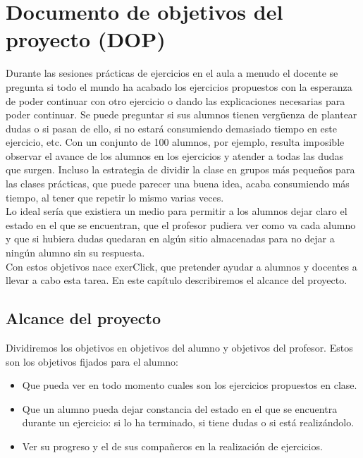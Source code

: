 
\pagestyle{fancy}

\chapter{Documento de objetivos del proyecto (DOP)}
\label{objetivos}

Durante las sesiones prácticas de ejercicios en el aula a menudo el docente se pregunta si todo el mundo ha acabado los ejercicios propuestos con la esperanza de poder continuar con otro ejercicio o dando las explicaciones necesarias para poder continuar. Se puede preguntar si sus alumnos tienen vergüenza de plantear dudas o si pasan de ello, si no estará consumiendo demasiado tiempo en este ejercicio, etc. Con un conjunto de 100 alumnos, por ejemplo, resulta imposible observar el avance de los alumnos en los ejercicios y atender a todas las dudas que surgen. Incluso la estrategia de dividir la clase en grupos más pequeños para las clases prácticas, que puede parecer una buena idea, acaba consumiendo más tiempo, al tener que repetir lo mismo varias veces.\\

Lo ideal sería que existiera un medio para permitir a los alumnos dejar claro el estado en el que se encuentran, que el profesor pudiera ver como va cada alumno y que si hubiera dudas quedaran en algún sitio almacenadas para no dejar a ningún alumno sin su respuesta.\\

Con estos objetivos nace exerClick, que pretender ayudar a alumnos y docentes a llevar a cabo esta tarea. En este capítulo describiremos el alcance del proyecto.\\


\section{Alcance del proyecto}

Dividiremos los objetivos en objetivos del alumno y objetivos del profesor. Estos son los objetivos fijados para el alumno:

\begin{itemize}
\item Que pueda ver en todo momento cuales son los ejercicios propuestos en clase.
\item Que un alumno pueda dejar constancia del estado en el que se encuentra durante un ejercicio: si lo ha terminado, si tiene dudas o si está realizándolo.
\item Ver su progreso y el de sus compañeros en la realización de ejercicios.
\end{itemize}

